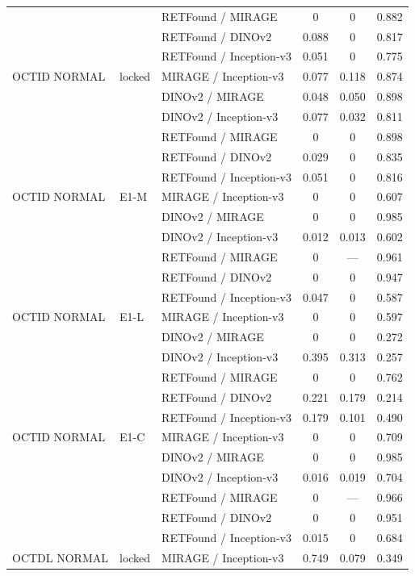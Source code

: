 \begin{longtable}{@{}lllccc@{}}
 &  & RETFound / MIRAGE & 0 & 0 & 0.882 \\
 &  & RETFound / DINOv2 & 0.088 & 0 & 0.817 \\
 &  & RETFound / Inception-v3 & 0.051 & 0 & 0.775 \\
\addlinespace[1pt]
OCTID NORMAL & locked & MIRAGE / Inception-v3 & 0.077 & 0.118 & 0.874 \\
 &  & DINOv2 / MIRAGE & 0.048 & 0.050 & 0.898 \\
 &  & DINOv2 / Inception-v3 & 0.077 & 0.032 & 0.811 \\
 &  & RETFound / MIRAGE & 0 & 0 & 0.898 \\
 &  & RETFound / DINOv2 & 0.029 & 0 & 0.835 \\
 &  & RETFound / Inception-v3 & 0.051 & 0 & 0.816 \\
\addlinespace[1pt]
OCTID NORMAL & E1-M & MIRAGE / Inception-v3 & 0 & 0 & 0.607 \\
 &  & DINOv2 / MIRAGE & 0 & 0 & 0.985 \\
 &  & DINOv2 / Inception-v3 & 0.012 & 0.013 & 0.602 \\
 &  & RETFound / MIRAGE & 0 & --- & 0.961 \\
 &  & RETFound / DINOv2 & 0 & 0 & 0.947 \\
 &  & RETFound / Inception-v3 & 0.047 & 0 & 0.587 \\
\addlinespace[1pt]
OCTID NORMAL & E1-L & MIRAGE / Inception-v3 & 0 & 0 & 0.597 \\
 &  & DINOv2 / MIRAGE & 0 & 0 & 0.272 \\
 &  & DINOv2 / Inception-v3 & 0.395 & 0.313 & 0.257 \\
 &  & RETFound / MIRAGE & 0 & 0 & 0.762 \\
 &  & RETFound / DINOv2 & 0.221 & 0.179 & 0.214 \\
 &  & RETFound / Inception-v3 & 0.179 & 0.101 & 0.490 \\
\addlinespace[1pt]
OCTID NORMAL & E1-C & MIRAGE / Inception-v3 & 0 & 0 & 0.709 \\
 &  & DINOv2 / MIRAGE & 0 & 0 & 0.985 \\
 &  & DINOv2 / Inception-v3 & 0.016 & 0.019 & 0.704 \\
 &  & RETFound / MIRAGE & 0 & --- & 0.966 \\
 &  & RETFound / DINOv2 & 0 & 0 & 0.951 \\
 &  & RETFound / Inception-v3 & 0.015 & 0 & 0.684 \\
\addlinespace[1pt]
OCTDL NORMAL & locked & MIRAGE / Inception-v3 & 0.749 & 0.079 & 0.349 \\

\end{longtable}
